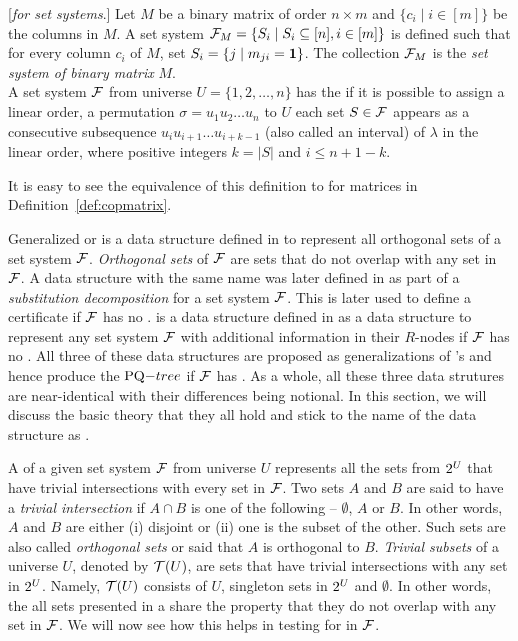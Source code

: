 \begin{definition}%
  \label{def:matrixsetsystem}%
  [\emph{\Cop for set systems}.]  Let $M$ be a binary matrix of order
  $n \times m$ %
  and $\{c_i \mid i \in [m]\}$ be the columns in $M$. A set system
  ${\cal F}_{M} = \{S_i \mid S_i \subseteq [n], i \in [m]\}$ is defined
  such that for every column $c_i$ of $M$, set $S_i = \{j \mid m_{ji}
  = \textbf{1} \}$. The collection ${\cal F}_M$ is the {\em set system of binary
    matrix} $M$.\\
  A set system ${\cal F}$ from universe $U = \{1, 2, \ldots, n\}$ has the
  {\em \cop} if it is possible to assign a linear order, \ie a
  permutation $\sigma = u_1u_2\ldots u_n$ to $U$ \stt each set $S \in
  {\cal F}$ appears as a consecutive subsequence $u_{i}u_{i+1}\ldots
  u_{i+k-1}$ (also called an interval) of $\lambda$ in the linear order, where
  positive integers $k = |S|$ and $i \le n+1-k$.
\end{definition}

It is easy to see the equivalence of this definition to \COP for
matrices in Definition~\ref{def:copmatrix}.

Generalized \PQtree or \gPQtree is a data structure defined in \cite{n89} to
represent all orthogonal sets of a set system ${\cal F}$. {\em Orthogonal
  sets} of ${\cal F}$ are sets that do not overlap with any set in ${\cal F}$. A
data structure with the same name was later defined in \cite{mcc04} as
part of a {\em substitution decomposition} for a set system
${\cal F}$.  This is later used to define
a certificate if ${\cal F}$ has no \COP. \PQRtree is a data structure
defined in \cite{mm96} as a data structure to represent any set system
${\cal F}$ with additional information in their $R$-nodes if ${\cal F}$ has no
\COP.  All three of these data structures are proposed as
generalizations of \cite{bl76}'s \PQtree and hence produce the
$\PQtree$ if ${\cal F}$ has \COP. As a whole, all these three data
strutures are near-identical with their differences being notional.
In this section, we will discuss the basic theory that they all hold
and stick to the name of the data structure as \PQRtree.

A \PQRtree of a given set system ${\cal F}$ from universe $U$ represents
all the sets from $2^{U}$ that have trivial intersections with
every set in ${\cal F}$.  Two sets $A$ and $B$ are said to have a {\em
  trivial intersection} if $A \cap B$ is one of the following --
$\emptyset$, $A$ or $B$. In other words, $A$ and $B$ are either (i)
disjoint or (ii) one is the subset of the other. Such sets are also
called {\em orthogonal sets} or said that $A$ is orthogonal to $B$. {\em Trivial subsets}
of a universe $U$, denoted by ${\cal T}(U)$, are sets that have trivial
intersections with any set in $2^{U}$. Namely, ${\cal T}(U)$ consists
of $U$, singleton sets in $2^{U}$ and $\emptyset$\cite{n89, mm96}.
In other words, the all sets presented in a \PQRtree share the
property that they do not overlap with any set in ${\cal F}$. We will now
see how this helps in testing for \COP in ${\cal F}$.

